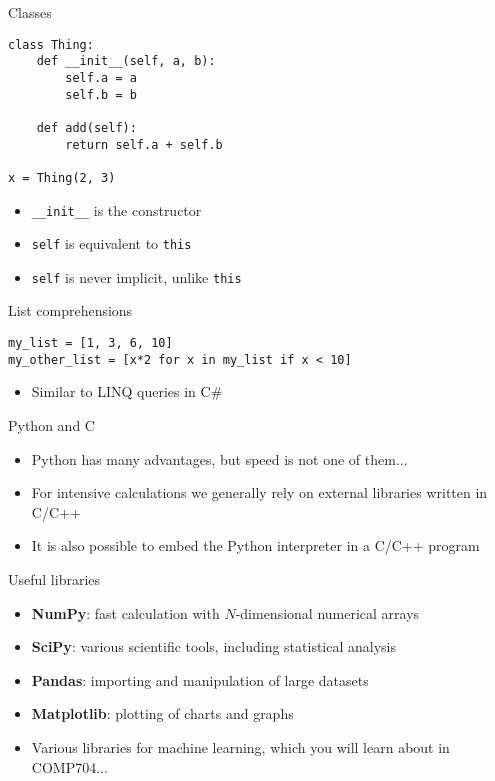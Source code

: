 \begin{frame}[fragile]{Classes}
    \begin{lstlisting}
class Thing:
    def __init__(self, a, b):
        self.a = a
        self.b = b

    def add(self):
        return self.a + self.b

x = Thing(2, 3)
    \end{lstlisting}
    \begin{itemize}
        \pause\item \lstinline{__init__} is the constructor
        \pause\item \lstinline{self} is equivalent to \lstinline{this}
        \pause\item \lstinline{self} is never implicit, unlike \lstinline{this}
    \end{itemize}
\end{frame}

\begin{frame}[fragile]{List comprehensions}
    \begin{lstlisting}
my_list = [1, 3, 6, 10]
my_other_list = [x*2 for x in my_list if x < 10]
    \end{lstlisting}
    \begin{itemize}
        \pause\item Similar to LINQ queries in C\#
    \end{itemize}
\end{frame}

\begin{frame}{Python and C}
    \begin{itemize}
        \pause\item Python has many advantages, but speed is not one of them...
        \pause\item For intensive calculations we generally rely on external libraries written in C/C++
        \pause\item It is also possible to embed the Python interpreter in a C/C++ program
    \end{itemize}
\end{frame}

\begin{frame}{Useful libraries}
    \begin{itemize}
        \pause\item \textbf{NumPy}: fast calculation with $N$-dimensional numerical arrays
        \pause\item \textbf{SciPy}: various scientific tools, including statistical analysis
        \pause\item \textbf{Pandas}: importing and manipulation of large datasets
        \pause\item \textbf{Matplotlib}: plotting of charts and graphs
        \pause\item Various libraries for machine learning, which you will learn about in COMP704...
    \end{itemize}
\end{frame}
